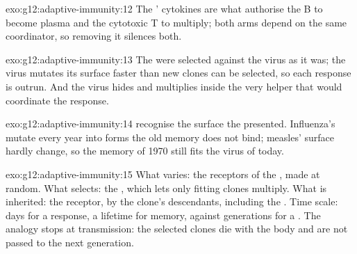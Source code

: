 \begin{solution}{exo:g12:adaptive-immunity:12}
The ' cytokines are what authorise the B  to become
plasma  and the cytotoxic T  to multiply; both arms depend
on the same coordinator, so removing it silences both.
\end{solution}

\begin{solution}{exo:g12:adaptive-immunity:13}
The  were selected against the virus as it was; the virus
mutates its surface  faster than new clones can be selected,
so each response is outrun. And the virus hides and multiplies inside
the very helper  that would coordinate the response.
\end{solution}

\begin{solution}{exo:g12:adaptive-immunity:14}
 recognise the surface  the  presented.
Influenza's mutate every year into forms the old memory does not bind;
measles' surface  hardly change, so the memory of 1970 still
fits the virus of today.
\end{solution}

\begin{solution}{exo:g12:adaptive-immunity:15}
What varies: the receptors of the , made at random. What
selects: the , which lets only fitting clones multiply. What is
inherited: the receptor, by the clone's descendants, including the
. Time scale: days for a response, a lifetime for memory,
against generations for a . The analogy stops at
transmission: the selected clones die with the body and are not
passed to the next generation.
\end{solution}

